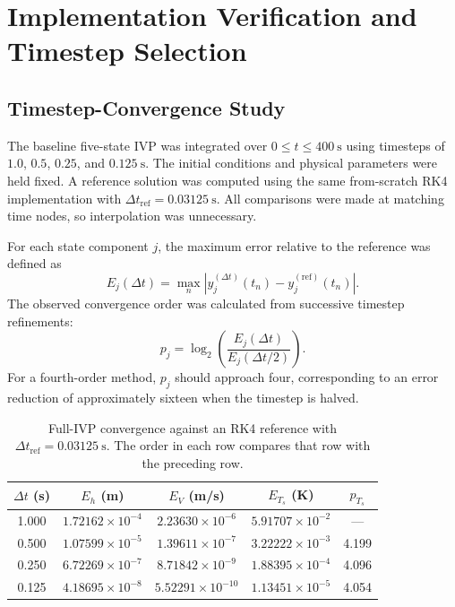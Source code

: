 \documentclass[conf]{new-aiaa}
\begin{document}
\section{Implementation Verification and Timestep Selection}

\subsection{Timestep-Convergence Study}

The baseline five-state IVP was integrated over
$0 \leq t \leq 400~\mathrm{s}$ using timesteps of
$1.0$, $0.5$, $0.25$, and $0.125~\mathrm{s}$.
The initial conditions and physical parameters were held fixed.
A reference solution was computed using the same from-scratch
RK4 implementation with
$\Delta t_{\mathrm{ref}}=0.03125~\mathrm{s}$.
All comparisons were made at matching time nodes, so interpolation
was unnecessary.

For each state component $j$, the maximum error relative to the
reference was defined as
\begin{equation}
E_j(\Delta t)
=
\max_n
\left|
y_j^{(\Delta t)}(t_n)
-
y_j^{(\mathrm{ref})}(t_n)
\right|.
\end{equation}
The observed convergence order was calculated from successive
timestep refinements:
\begin{equation}
p_j
=
\log_2
\left(
\frac{E_j(\Delta t)}
     {E_j(\Delta t/2)}
\right).
\end{equation}
For a fourth-order method, $p_j$ should approach four, corresponding
to an error reduction of approximately sixteen when the timestep
is halved.

\begin{table}[htbp]
\caption{Full-IVP convergence against an RK4 reference with
$\Delta t_{\mathrm{ref}}=0.03125~\mathrm{s}$. The order in each
row compares that row with the preceding row.}
\label{tab:flight-convergence}
\centering
\small
\begin{tabular}{ccccc}
\hline
$\Delta t$ (s) &
$E_h$ (m) &
$E_V$ (m/s) &
$E_{T_s}$ (K) &
$p_{T_s}$ \\
\hline
1.000 & $1.72162\times10^{-4}$ &
$2.23630\times10^{-6}$ &
$5.91707\times10^{-2}$ & --- \\
0.500 & $1.07599\times10^{-5}$ &
$1.39611\times10^{-7}$ &
$3.22222\times10^{-3}$ & 4.199 \\
0.250 & $6.72269\times10^{-7}$ &
$8.71842\times10^{-9}$ &
$1.88395\times10^{-4}$ & 4.096 \\
0.125 & $4.18695\times10^{-8}$ &
$5.52291\times10^{-10}$ &
$1.13451\times10^{-5}$ & 4.054 \\
\hline
\end{tabular}
\end{table}
\end{document}
